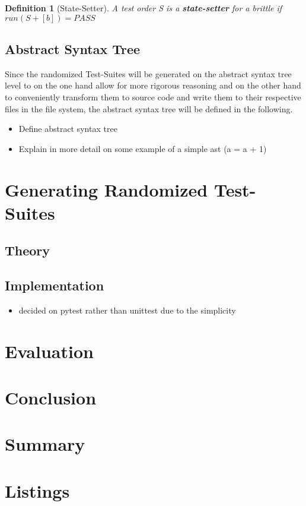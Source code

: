 \documentclass[
fancyheadings, %
%
%
]{stsreprt}
\newtheorem{definition}{Definition}
\begin{document}
\begin{definition}[State-Setter] %
    A test order S is a \textbf{state-setter} for a brittle if $run(S + [b]) = PASS$
\end{definition}

\section{Abstract Syntax Tree}
Since the randomized Test-Suites will be generated on the abstract syntax tree level to on the one hand allow for more rigorous reasoning and on the other hand to conveniently transform them to source code and write them to their respective files in the file system, the abstract syntax tree will be defined in the following. 
\begin{itemize}
    \item Define abstract syntax tree
    \item Explain in more detail on some example of a simple ast (a = a + 1)
\end{itemize}



\chapter{Generating Randomized Test-Suites} \label{approach}

\section{Theory}
\lipsum[40-69]

\section{Implementation}
\begin{itemize}
    \item decided on pytest rather than unittest due to the simplicity
\end{itemize}

\chapter{Evaluation}
\lipsum[70-89]



\chapter{Conclusion}
\lipsum[80-99]



\chapter{Summary}
\lipsum[80-99]



\appendix
\chapter{Listings}
\lipsum[90-99]



\backmatter


\end{document}
